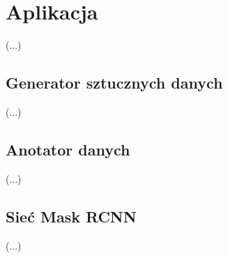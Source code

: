 \chapter{Aplikacja}

(...)

\section{Generator sztucznych danych}

(...)

\section{Anotator danych}

(...)

\section{Sieć Mask RCNN}

(...)
